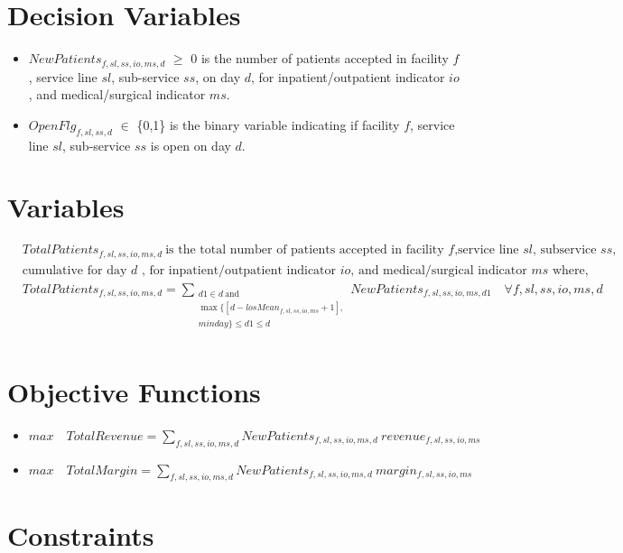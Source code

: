 \documentclass[10pt, letterpaper]{article}
\begin{document}
\section*{Decision Variables}
\begin{itemize}
\item [ ] $NewPatients_{f,sl,ss,io,ms,d}$ $\geq$ {0} is the number of patients accepted in facility $f$, service line $sl$, sub-service $ss$, on day $d$, for inpatient/outpatient indicator $io$, and medical/surgical indicator $ms$.
\item [ ] $OpenFlg_{f,sl,ss,d}$ $\in$ \{0,1\} is the binary variable indicating if facility $f$, service line $sl$, sub-service $ss$ is open on day $d$.
\end{itemize}

\section*{Variables}
\begin{align*}
&TotalPatients_{f,sl,ss,io,ms,d} \ \text{is the total number of patients accepted in facility $f$,service line $sl$, subservice $ss$,} \\
&\text{cumulative for day $d$ , for inpatient/outpatient indicator $io$, and medical/surgical indicator $ms$ where,} \\
&TotalPatients_{f,sl,ss,io,ms,d} =
\sum_{\substack{d1 \in d \ \text{and} \\
\max \{[d - losMean_{f,sl,ss,io,ms} + 1], \\ minday \} \leq d1 \leq d}}  NewPatients_{f,sl,ss,io,ms,d1} \quad \forall f,sl,ss,io,ms,d\ \\
\end{align*}


\section*{Objective Functions}
\begin{itemize}
\item [ ] $max \quad TotalRevenue=\sum_{f,sl,ss,io,ms,d} NewPatients_{f,sl,ss,io,ms,d} \ revenue_{f,sl,ss,io,ms}$
\item [ ] $max \quad TotalMargin=\sum_{f,sl,ss,io,ms,d} NewPatients_{f,sl,ss,io,ms,d} \ margin_{f,sl,ss,io,ms}$
\end{itemize}


\section*{Constraints}
\end{document}
